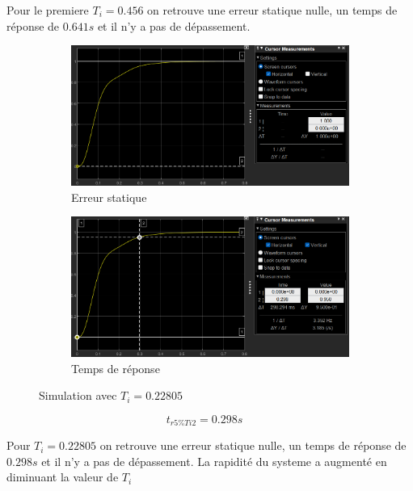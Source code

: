 \documentclass[12pt, a4paper]{report}
\begin{document}
Pour le premiere $T_i = 0.456$ on retrouve une erreur statique nulle, un temps de réponse de $0.641s$ et il n'y a pas de dépassement.

\begin{figure}[H]
    \begin{subfigure}[h!]{0.4\linewidth}
        \includegraphics[width=\linewidth]{sim2ti2erreur.png}
        \caption{Erreur statique}
    \end{subfigure}
    \hfill    
    \begin{subfigure}[h!]{0.4\linewidth}
        \includegraphics[width=\linewidth]{sim2ti2tr.png}
        \caption{Temps de réponse}
    \end{subfigure}
    \caption{Simulation avec $T_i = 0.22805$}
    \label{fig:sim2KTi2}
\end{figure}

\[
    t_{r5\%Ti2} = 0.298s \quad
\]

Pour $T_i = 0.22805$ on retrouve une erreur statique nulle, un temps de réponse de $ 0.298s$ et il n'y a pas de dépassement.
La rapidité du systeme a augmenté en diminuant la valeur de $T_i$
\end{document}
